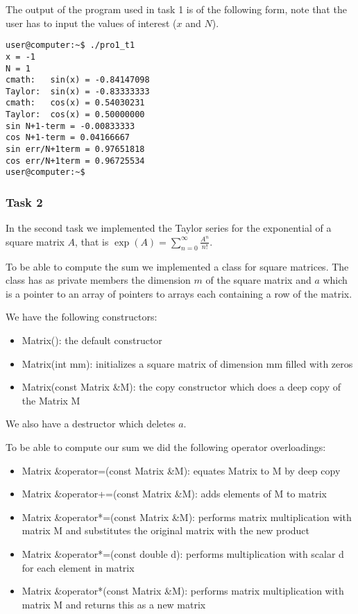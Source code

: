 \documentclass[a4paper,10pt]{article}
\begin{document}
\FloatBarrier
\newpage
The output of the program used in task 1 is of the following form, note that the user has to input
the values of interest ($x$ and $N$).
\begin{center}
\begin{minipage}[t]{85mm}
\begin{lstlisting}
user@computer:~$ ./pro1_t1 
x = -1
N = 1
cmath:   sin(x) = -0.84147098
Taylor:  sin(x) = -0.83333333
cmath:   cos(x) = 0.54030231
Taylor:  cos(x) = 0.50000000
sin N+1-term = -0.00833333
cos N+1-term = 0.04166667
sin err/N+1term = 0.97651818
cos err/N+1term = 0.96725534
user@computer:~$ 
\end{lstlisting}
\end{minipage}
\end{center}

\subsubsection*{Task 2}
In the second task we implemented the Taylor series for the exponential of a square matrix $A$, that is $\exp(A) = \sum_{n=0}^\infty \frac{A^{n}}{n!}$. 

To be able to compute the sum we implemented a class for square matrices. The class has as private members the dimension $m$ of the square matrix and $a$ which is a pointer to an array of pointers to arrays each containing a row of the matrix. 

We have the following constructors:
\begin{itemize}
\item Matrix(): the default constructor
\item Matrix(int mm): initializes a square matrix of dimension mm filled with zeros
\item Matrix(const Matrix \&M): the copy constructor which does a deep copy of the Matrix M
\end{itemize}
We also have a destructor which deletes $a$.

To be able to compute our sum we did the following operator overloadings: 
\begin{itemize}
\item Matrix \&operator=(const Matrix \&M): equates Matrix to M by deep copy
\item Matrix \&operator+=(const Matrix \&M): adds elements of M to matrix
\item Matrix \&operator*=(const Matrix \&M): performs matrix multiplication with matrix M and substitutes the original matrix with the new product
\item Matrix \&operator*=(const double d): performs multiplication with scalar d for each element in matrix
\item Matrix \&operator*(const Matrix \&M): performs matrix multiplication with matrix M and returns this as a new matrix
\end{itemize}
\end{document}
